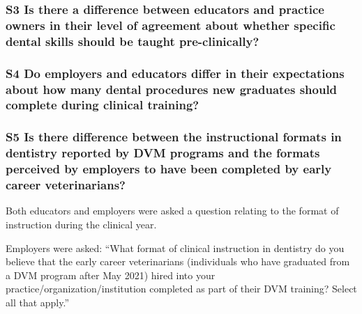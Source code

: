 \documentclass[
  11pt,
  letterpaper,
  DIV=11,
  numbers=noendperiod]{scrartcl}
\begin{document}
\hypertarget{s3-is-there-a-difference-between-educators-and-practice-owners-in-their-level-of-agreement-about-whether-specific-dental-skills-should-be-taught-pre-clinically}{%
\subsubsection{S3 Is there a difference between educators and practice
owners in their level of agreement about whether specific dental skills
should be taught
pre-clinically?}\label{s3-is-there-a-difference-between-educators-and-practice-owners-in-their-level-of-agreement-about-whether-specific-dental-skills-should-be-taught-pre-clinically}}

\hypertarget{s4-do-employers-and-educators-differ-in-their-expectations-about-how-many-dental-procedures-new-graduates-should-complete-during-clinical-training}{%
\subsubsection{S4 Do employers and educators differ in their
expectations about how many dental procedures new graduates should
complete during clinical
training?}\label{s4-do-employers-and-educators-differ-in-their-expectations-about-how-many-dental-procedures-new-graduates-should-complete-during-clinical-training}}

\hypertarget{s5-is-there-difference-between-the-instructional-formats-in-dentistry-reported-by-dvm-programs-and-the-formats-perceived-by-employers-to-have-been-completed-by-early-career-veterinarians}{%
\subsubsection{S5 Is there difference between the instructional formats
in dentistry reported by DVM programs and the formats perceived by
employers to have been completed by early career
veterinarians?}\label{s5-is-there-difference-between-the-instructional-formats-in-dentistry-reported-by-dvm-programs-and-the-formats-perceived-by-employers-to-have-been-completed-by-early-career-veterinarians}}

Both educators and employers were asked a question relating to the
format of instruction during the clinical year.

Employers were asked: ``What format of clinical instruction in dentistry
do you believe that the early career veterinarians (individuals who have
graduated from a DVM program after May 2021) hired into your
practice/organization/institution completed as part of their DVM
training? Select all that apply.''
\end{document}
